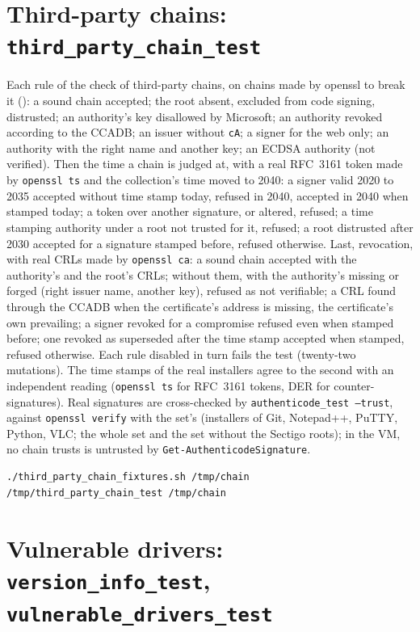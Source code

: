 \documentclass[11pt,a4paper,oneside]{report}
\begin{document}
\section{Third-party chains: \texttt{third\_party\_chain\_test}}

Each rule of the check of third-party chains, on chains made by openssl to
break it (): a sound chain accepted;
the root absent, excluded from code signing, distrusted; an authority's key
disallowed by Microsoft; an authority revoked according to the CCADB; an
issuer without \texttt{cA}; a signer for the web only; an authority with the
right name and another key; an ECDSA authority (not verified). Then the time
a chain is judged at, with a real RFC~3161 token made by \texttt{openssl ts}
and the collection's time moved to 2040: a signer valid 2020 to 2035 accepted
without time stamp today, refused in 2040, accepted in 2040 when stamped
today; a token over another signature, or altered, refused; a time stamping
authority under a root not trusted for it, refused; a root distrusted after
2030 accepted for a signature stamped before, refused otherwise. Last,
revocation, with real CRLs made by \texttt{openssl ca}: a sound chain accepted
with the authority's and the root's CRLs; without them, with the authority's
missing or forged (right issuer name, another key), refused as not
verifiable; a CRL found through the CCADB when the certificate's address is
missing, the certificate's own prevailing; a signer revoked for a compromise
refused even when stamped before; one revoked as superseded after the time
stamp accepted when stamped, refused otherwise. Each rule disabled in turn
fails the test (twenty-two mutations). The time stamps of the
real installers agree to the second with an independent reading
(\texttt{openssl ts} for RFC~3161 tokens, DER for counter-signatures). Real signatures are
cross-checked by \texttt{authenticode\_test --trust}, against \texttt{openssl
verify} with the set's  (installers of Git, Notepad++,
PuTTY, Python, VLC; the whole set and the set without the Sectigo roots); in
the VM, no chain \wac{} trusts is untrusted by
\texttt{Get-AuthenticodeSignature}.

\begin{lstlisting}
./third_party_chain_fixtures.sh /tmp/chain
/tmp/third_party_chain_test /tmp/chain
\end{lstlisting}

\section{Vulnerable drivers: \texttt{version\_info\_test}, \texttt{vulnerable\_drivers\_test}}
\end{document}
